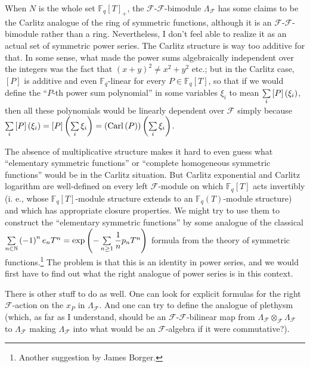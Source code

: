 \documentclass[numbers=enddot,12pt,final,onecolumn,notitlepage]{scrartcl}%
\theoremstyle{definition}
\let\sumnonlimits\sum
\renewcommand{\sum}{\sumnonlimits\limits}
\begin{document}
When $N$ is the whole set $\mathbb{F}_{q}\left[  T\right]  _{+}$, the
$\mathcal{F}$-$\mathcal{F}$-bimodule $\Lambda_{\mathcal{F}}$ has some claims
to be the Carlitz analogue of the ring of symmetric functions, although it is
an $\mathcal{F}$-$\mathcal{F}$-bimodule rather than a ring. Nevertheless, I
don't feel able to realize it as an actual set of symmetric power series. The
Carlitz structure is way too additive for that. In some sense, what made the
power sums algebraically independent over the integers was the fact that
$\left(  x+y\right)  ^{2}\neq x^{2}+y^{2}$ etc.; but in the Carlitz case,
$\left[  P\right]  $ is additive and even $\mathbb{F}_{q}$-linear for every
$P\in\mathbb{F}_{q}\left[  T\right]  $, so that if we would define the
``$P$-th power sum polynomial'' in some variables $\xi_{i}$ to mean
$\sum\limits_{i}\left[  P\right]  \left(  \xi_{i}\right)  $, then all these
polynomials would be linearly dependent over $\mathcal{F}$ simply because
$\sum\limits_{i}\left[  P\right]  \left(  \xi_{i}\right)  =\left[  P\right]
\left(  \sum\limits_{i}\xi_{i}\right)  =\left(  \operatorname*{Carl}\left(
P\right)  \right)  \left(  \sum\limits_{i}\xi_{i}\right)  $.

The absence of multiplicative structure makes it hard to even guess what
``elementary symmetric functions'' or ``complete homogeneous symmetric
functions'' would be in the Carlitz situation. But Carlitz exponential and
Carlitz logarithm are well-defined on every left $\mathcal{F}$-module on which
$\mathbb{F}_{q}\left[  T\right]  $ acts invertibly (i. e., whose
$\mathbb{F}_{q}\left[  T\right]  $-module structure extends to an
$\mathbb{F}_{q}\left(  T\right)  $-module structure) and which has appropriate
closure properties. We might try to use them to construct the ``elementary
symmetric functions'' by some analogue of the classical $\sum\limits_{n\in
\mathbb{N}}\left(  -1\right)  ^{n}e_{n}T^{n}=\exp\left(  -\sum\limits_{n\geq
1}\dfrac{1}{n}p_{n}T^{n}\right)  $ formula from the theory of symmetric
functions.\footnote{Another suggestion by James Borger.} The problem is that
this is an identity in power series, and we would first have to find out what
the right analogue of power series is in this context.

There is other stuff to do as well. One can look for explicit formulas for the
right $\mathcal{F}$-action on the $x_{P}$ in $\Lambda_{\mathcal{F}}$. And one
can try to define the analogue of plethysm (which, as far as I understand,
should be an $\mathcal{F}$-$\mathcal{F}$-bilinear map from $\Lambda
_{\mathcal{F}}\otimes_{\mathcal{F}}\Lambda_{\mathcal{F}}$ to $\Lambda
_{\mathcal{F}}$ making $\Lambda_{\mathcal{F}}$ into what would be an
$\mathcal{F}$-algebra if it were commutative?).
\end{document}
